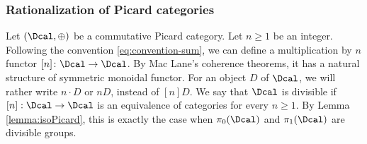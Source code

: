 \subsubsection{Rationalization of Picard categories}\label{subsubsec:rationalization-picard-categories}
Let $(\Dcal,\oplus)$ be a commutative Picard category. Let $n\geq 1$ be an integer. Following the convention \eqref{eq:convention-sum}, we can define a multiplication by $n$ functor $[n]\colon\Dcal\to\Dcal$. By Mac Lane's coherence theorems, it has a natural structure of symmetric monoidal functor. For an object $D$ of $\Dcal$, we will rather write $n\cdot D$ or $nD$, instead of $[n]D$. We say that $\Dcal$ is divisible if $[n]: \Dcal \to \Dcal$ is an equivalence of categories for every $n\geq 1$. By Lemma \ref{lemma:isoPicard}, this is exactly the case when $\pi_0(\Dcal)$ and $\pi_1(\Dcal)$ are divisible groups.

